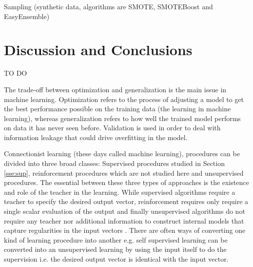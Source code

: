 \documentclass[11pt]{article}
\theoremstyle{definition}
\theoremstyle{remark}
\begin{document}
Sampling (synthetic data, algorithms are SMOTE, SMOTEBoost and EasyEnsemble)


\section{Discussion and Conclusions}
\label{se:dis}
TO DO

The trade-off between optimization and generalization is the main issue in machine learning. Optimization refers to the process of adjusting a model to get the best performance possible on the training data (the learning in machine learning), whereas generalization refers to how well the trained model performs on data it has never seen before.
Validation is used in order to deal with information leakage that could drive overfitting in the model.


Connectionist learning (these days called machine learning), procedures can be divided into three broad classes: Supervised procedures studied in Section \ref{sse:sup}, reinforcement procedures which are not studied here and unsupervised procedures.
The essential between these three types of approaches is the existence and role of the teacher in the learning.
While supervised algorithms require a teacher to specify the desired output vector, reinforcement requires only require a single scalar evaluation of the output and finally unsupervised algorithms do not require any teacher nor additional information to  construct internal models that capture regularities in the input vectors  \cite{hinton1990connectionist}. There are often ways of converting one kind of learning procedure into another e.g. self supervised learning can be converted into an unsupervised learning by using the input itself to do the supervision i.e. the desired output vector is identical with the input vector.


\newpage





\end{document}
